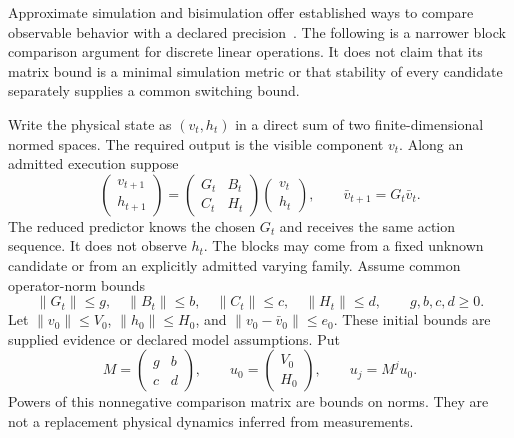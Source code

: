 \documentclass[11pt,letterpaper]{article}
\theoremstyle{plain}
\theoremstyle{definition}
\begin{document}
Approximate simulation and bisimulation offer established ways to compare observable behavior with a declared precision~\cite{girard}. The following is a narrower block comparison argument for discrete linear operations. It does not claim that its matrix bound is a minimal simulation metric or that stability of every candidate separately supplies a common switching bound.

Write the physical state as $(v_t,h_t)$ in a direct sum of two finite-dimensional normed spaces. The required output is the visible component $v_t$. Along an admitted execution suppose
\[
 \begin{pmatrix}v_{t+1}\\h_{t+1}\end{pmatrix}
 =\begin{pmatrix}G_t&B_t\\C_t&H_t\end{pmatrix}
  \begin{pmatrix}v_t\\h_t\end{pmatrix},
 \qquad \bar v_{t+1}=G_t\bar v_t. \tag{13}
\]
The reduced predictor knows the chosen $G_t$ and receives the same action sequence. It does not observe $h_t$. The blocks may come from a fixed unknown candidate or from an explicitly admitted varying family. Assume common operator-norm bounds
\[
 \|G_t\|\le g,\quad \|B_t\|\le b,\quad
 \|C_t\|\le c,\quad \|H_t\|\le d,
 \qquad g,b,c,d\ge0.
\]
Let $\|v_0\|\le V_0$, $\|h_0\|\le H_0$, and $\|v_0-\bar v_0\|\le e_0$. These initial bounds are supplied evidence or declared model assumptions. Put
\[
 M=\begin{pmatrix}g&b\\c&d\end{pmatrix},\qquad
 u_0=\begin{pmatrix}V_0\\H_0\end{pmatrix},\qquad u_j=M^ju_0.
\]
Powers of this nonnegative comparison matrix are bounds on norms. They are not a replacement physical dynamics inferred from measurements.
\end{document}
